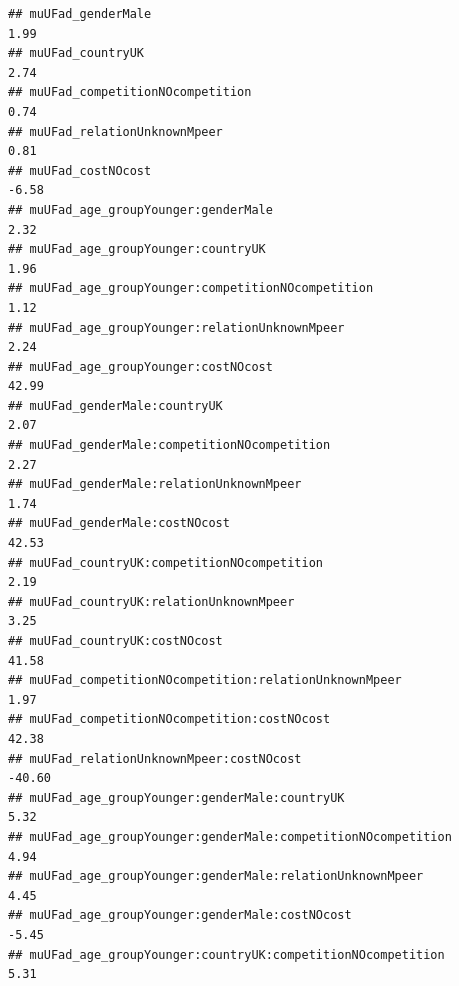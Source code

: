 \documentclass[
]{article}
\begin{document}
\begin{verbatim}
## muUFad_genderMale                                                                                1.99
## muUFad_countryUK                                                                                 2.74
## muUFad_competitionNOcompetition                                                                  0.74
## muUFad_relationUnknownMpeer                                                                      0.81
## muUFad_costNOcost                                                                               -6.58
## muUFad_age_groupYounger:genderMale                                                               2.32
## muUFad_age_groupYounger:countryUK                                                                1.96
## muUFad_age_groupYounger:competitionNOcompetition                                                 1.12
## muUFad_age_groupYounger:relationUnknownMpeer                                                     2.24
## muUFad_age_groupYounger:costNOcost                                                              42.99
## muUFad_genderMale:countryUK                                                                      2.07
## muUFad_genderMale:competitionNOcompetition                                                       2.27
## muUFad_genderMale:relationUnknownMpeer                                                           1.74
## muUFad_genderMale:costNOcost                                                                    42.53
## muUFad_countryUK:competitionNOcompetition                                                        2.19
## muUFad_countryUK:relationUnknownMpeer                                                            3.25
## muUFad_countryUK:costNOcost                                                                     41.58
## muUFad_competitionNOcompetition:relationUnknownMpeer                                             1.97
## muUFad_competitionNOcompetition:costNOcost                                                      42.38
## muUFad_relationUnknownMpeer:costNOcost                                                         -40.60
## muUFad_age_groupYounger:genderMale:countryUK                                                     5.32
## muUFad_age_groupYounger:genderMale:competitionNOcompetition                                      4.94
## muUFad_age_groupYounger:genderMale:relationUnknownMpeer                                          4.45
## muUFad_age_groupYounger:genderMale:costNOcost                                                   -5.45
## muUFad_age_groupYounger:countryUK:competitionNOcompetition                                       5.31

\end{verbatim}
\end{document}

